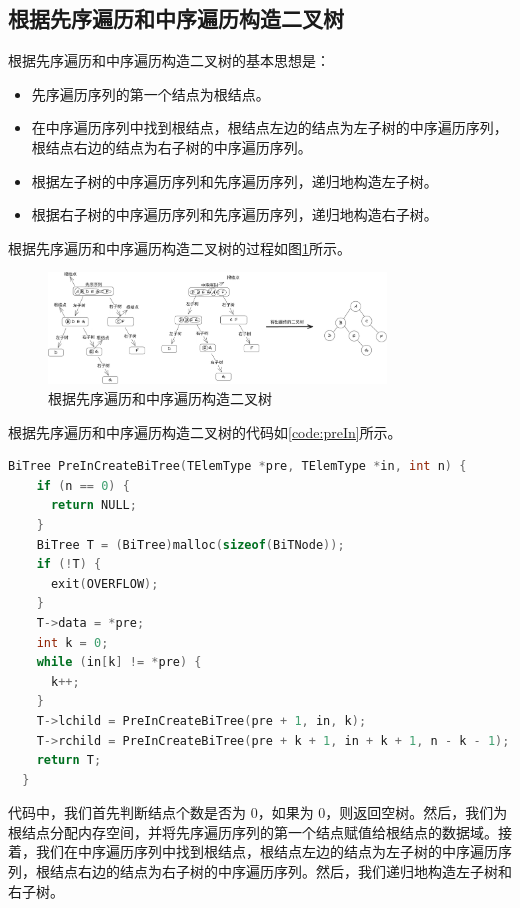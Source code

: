 \documentclass[lang=cn,newtx,10pt,scheme=chinese]{../elegantbook}
\begin{document}
\subsection{根据先序遍历和中序遍历构造二叉树}

根据先序遍历和中序遍历构造二叉树的基本思想是：

\begin{itemize}
  \item 先序遍历序列的第一个结点为根结点。
  \item 在中序遍历序列中找到根结点，根结点左边的结点为左子树的中序遍历序列，根结点右边的结点为右子树的中序遍历序列。
  \item 根据左子树的中序遍历序列和先序遍历序列，递归地构造左子树。
  \item 根据右子树的中序遍历序列和先序遍历序列，递归地构造右子树。
  \end{itemize}

根据先序遍历和中序遍历构造二叉树的过程如图\ref{fig:preIn}所示。

\begin{figure}[!htbp]
  \centering
  \includegraphics[width=0.8\textwidth]{./figure/fix/pdf/preAndIn.pdf}
  \caption{根据先序遍历和中序遍历构造二叉树}
  \label{fig:preIn}
\end{figure}

根据先序遍历和中序遍历构造二叉树的代码如\ref{code:preIn}所示。

\begin{lstlisting}[language=C++, caption={根据先序遍历和中序遍历构造二叉树}, label={code:preIn}]
  BiTree PreInCreateBiTree(TElemType *pre, TElemType *in, int n) {
    if (n == 0) {
      return NULL;
    }
    BiTree T = (BiTree)malloc(sizeof(BiTNode));
    if (!T) {
      exit(OVERFLOW);
    }
    T->data = *pre;
    int k = 0;
    while (in[k] != *pre) {
      k++;
    }
    T->lchild = PreInCreateBiTree(pre + 1, in, k);
    T->rchild = PreInCreateBiTree(pre + k + 1, in + k + 1, n - k - 1);
    return T;
  }
\end{lstlisting}

代码中，我们首先判断结点个数是否为 0，如果为 0，则返回空树。然后，我们为根结点分配内存空间，并将先序遍历序列的第一个结点赋值给根结点的数据域。接着，我们在中序遍历序列中找到根结点，根结点左边的结点为左子树的中序遍历序列，根结点右边的结点为右子树的中序遍历序列。然后，我们递归地构造左子树和右子树。
\end{document}
